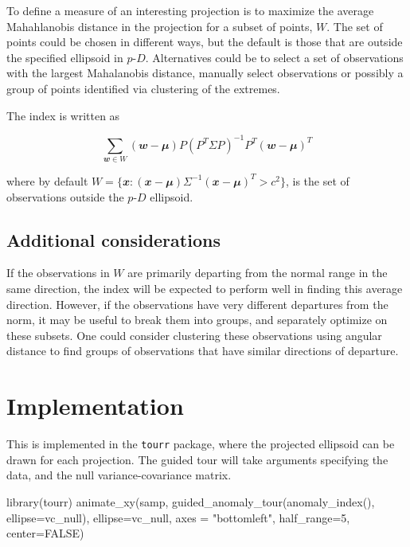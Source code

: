 \documentclass[
  12pt]{article}
\newenvironment{Shaded}{\begin{snugshade}}{\end{snugshade}}
\newcommand{\AttributeTok}[1]{\textcolor[rgb]{0.40,0.45,0.13}{#1}}
\newcommand{\ConstantTok}[1]{\textcolor[rgb]{0.56,0.35,0.01}{#1}}
\newcommand{\DecValTok}[1]{\textcolor[rgb]{0.68,0.00,0.00}{#1}}
\newcommand{\FunctionTok}[1]{\textcolor[rgb]{0.28,0.35,0.67}{#1}}
\newcommand{\NormalTok}[1]{\textcolor[rgb]{0.00,0.23,0.31}{#1}}
\newcommand{\StringTok}[1]{\textcolor[rgb]{0.13,0.47,0.30}{#1}}
\newcommand\pD{$p\text{-}D$}
\begin{document}
To define a measure of an interesting projection is to maximize the
average Mahahlanobis distance \citep{mahalanobis} in the projection for
a subset of points, \(W\). The set of points could be chosen in
different ways, but the default is those that are outside the specified
ellipsoid in \pD{}. Alternatives could be to select a set of
observations with the largest Mahalanobis distance, manually select
observations or possibly a group of points identified via clustering of
the extremes.

The index is written as

\[
\sum_{\mathbfit{w} \in W} (\mathbfit{w} - \mathbfit{\mu}) P (P^T\Sigma P)^{-1}P^T(\mathbfit{w} - \mathbfit{\mu})^T
\]

where by default
\(W = \{\mathbfit{x}: (\mathbfit{x}-\mathbfit{\mu}) \Sigma^{-1}(\mathbfit{x}-\mathbfit{\mu})^T > c^2\}\),
is the set of observations outside the \pD{} ellipsoid.

\subsection{Additional considerations}\label{additional-considerations}

If the observations in \(W\) are primarily departing from the normal
range in the same direction, the index will be expected to perform well
in finding this average direction. However, if the observations have
very different departures from the norm, it may be useful to break them
into groups, and separately optimize on these subsets. One could
consider clustering these observations using angular distance to find
groups of observations that have similar directions of departure.

\section{Implementation}\label{implementation}

This is implemented in the \texttt{tourr} \citep{tourr, tourr-cran}
package, where the projected ellipsoid can be drawn for each projection.
The guided tour will take arguments specifying the data, and the null
variance-covariance matrix.

\begin{Shaded}
\begin{Highlighting}[]
\FunctionTok{library}\NormalTok{(tourr)}
\FunctionTok{animate\_xy}\NormalTok{(samp, }\FunctionTok{guided\_anomaly\_tour}\NormalTok{(}\FunctionTok{anomaly\_index}\NormalTok{(),}
  \AttributeTok{ellipse=}\NormalTok{vc\_null), }\AttributeTok{ellipse=}\NormalTok{vc\_null, }
  \AttributeTok{axes =} \StringTok{"bottomleft"}\NormalTok{, }\AttributeTok{half\_range=}\DecValTok{5}\NormalTok{, }\AttributeTok{center=}\ConstantTok{FALSE}\NormalTok{)}
\end{Highlighting}
\end{Shaded}
\end{document}
